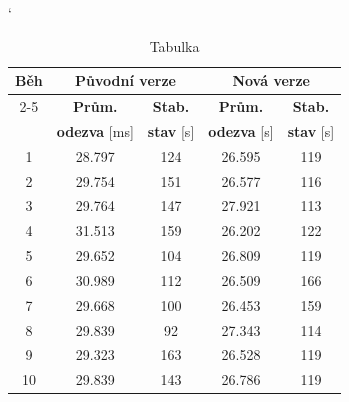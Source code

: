             \medskip
            \begin{table}[ht]
             \catcode`
             \begin{adjustwidth}{-0.4cm}{}
             \begin{center}
              \begin{tabular}{| c || c | c || c | c |} \hline
                \multirow{4}{*}{Běh}  &   \multicolumn{2}{c||}{\textbf{Původní verze}}  &  \multicolumn{2}{c|}{\textbf{Nová verze}}\\ \cline{2-5}
                 & \textbf{Prům.}   &  \textbf{Stab.}  &  \textbf{Prům.}  &  \textbf{Stab.} \\  
                 & \textbf{odezva} [ms]  &   \textbf{stav} [s]  &  \textbf{odezva} [s] &  \textbf{stav} [s]\\\hline
                1 & 28.797 & 124 &  26.595 & 119\\\hline
                2  & 29.754 & 151 & 26.577 & 116\\\hline
                3 & 29.764 & 147 & 27.921 & 113\\\hline
                4 & 31.513  & 159 & 26.202 & 122\\\hline
                5 & 29.652 & 104 & 26.809 & 119\\\hline\hline
                6 & 30.989 & 112 & 26.509 & 166\\\hline
                7 & 29.668 & 100 & 26.453 & 159\\\hline
                8 & 29.839 & 92 & 27.343 & 114\\\hline
                9 & 29.323 & 163 & 26.528 & 119\\\hline
                10 & 29.839 & 143 & 26.786 & 119\\\hline
              \end{tabular}
              \caption{Tabulka}
              \label{tab}
             \end{center}
            \end{adjustwidth}
            \end{table}









